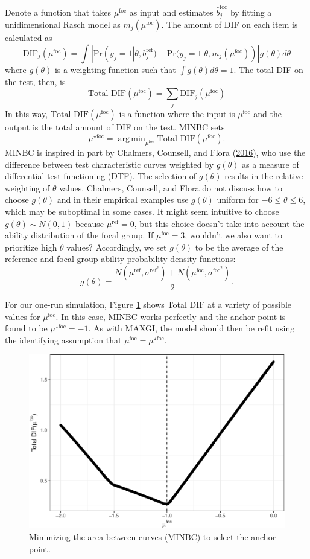 \documentclass[
  11pt,
]{article}
\begin{document}
Denote a function that takes \(\mu^\text{foc}\) as input and estimates \(\hat b_j^\text{foc}\) by fitting a unidimensional Rasch model as \(m_j(\mu^\text{foc})\). The amount of DIF on each item is calculated as
\[
\text{DIF}_j(\mu^\text{foc}) = \int |\text{Pr}(y_j = 1| \theta, b_j^{\text{ref}}) - \text{Pr}(y_j = 1| \theta, m_j(\mu^\text{foc}))| g(\theta)d\theta
\]
where \(g(\theta)\) is a weighting function such that \(\int g(\theta)d\theta = 1\). The total DIF on the test, then, is
\[
\text{Total DIF}(\mu^\text{foc}) = \sum_{j} \text{DIF}_j(\mu^\text{foc})
\]
In this way, \(\text{Total DIF}(\mu^\text{foc})\) is a function where the input is \(\mu^\text{foc}\) and the output is the total amount of DIF on the test. MINBC sets
\[
\mu^{\star\text{foc}} = \mathop\mathrm{arg\,min}_{\mu^\text{foc}} \text{Total DIF}(\mu^\text{foc}).
\]
MINBC is inspired in part by Chalmers, Counsell, and Flora (\protect\hyperlink{ref-chalmers2016might}{2016}), who use the difference between test characteristic curves weighted by \(g(\theta)\) as a measure of differential test functioning (DTF). The selection of \(g(\theta)\) results in the relative weighting of \(\theta\) values. Chalmers, Counsell, and Flora do not discuss how to choose \(g(\theta)\) and in their empirical examples use \(g(\theta)\) uniform for \(-6 \le \theta \le 6\), which may be suboptimal in some cases. It might seem intuitive to choose \(g(\theta) \sim N(0, 1)\) because \(\mu^\text{ref} = 0\), but this choice doesn't take into account the ability distribution of the focal group. If \(\mu^\text{foc} = 3\), wouldn't we also want to prioritize high \(\theta\) values? Accordingly, we set \(g(\theta)\) to be the average of the reference and focal group ability probability density functions:
\[
g(\theta) = \dfrac{N(\mu^{\text{ref}}, \sigma^{\text{ref}^2}) + N(\mu^{\text{foc}}, \sigma^{\text{foc}^2})}{2}.
\]

For our one-run simulation, Figure \ref{fig:mabc} shows Total DIF at a variety of possible values for \(\mu^\text{foc}\). In this case, MINBC works perfectly and the anchor point is found to be \(\mu^{\star\text{foc}} = -1\). As with MAXGI, the model should then be refit using the identifying assumption that \(\mu^{\text{foc}} = \mu^{\star\text{foc}}\).

\begin{figure}[H]

{\centering \includegraphics[width=0.7\linewidth]{paper_files/figure-latex/mabc-1} 

}

\caption{Minimizing the area between curves (MINBC) to select the anchor point.}\label{fig:mabc}
\end{figure}
\end{document}
